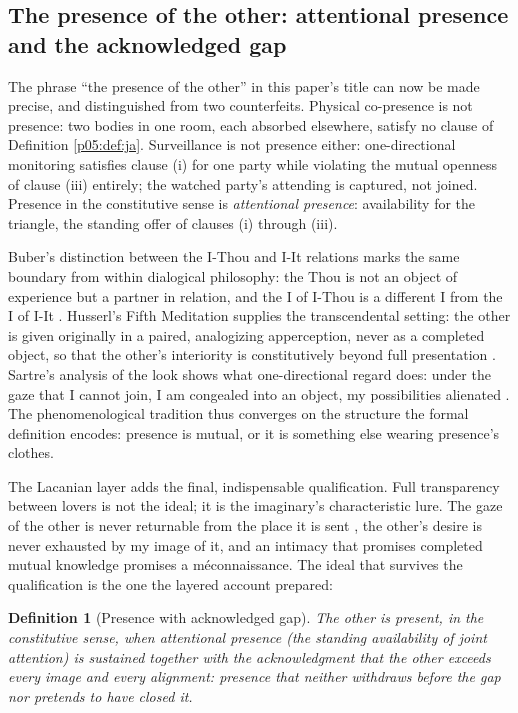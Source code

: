 \documentclass[11pt,a4paper]{article}
\theoremstyle{seriesthm}
\newtheorem{defn}{Definition}
\begin{document}
\subsection{The presence of the other: attentional presence and the acknowledged gap}
\label{p05:sec:presence}

The phrase ``the presence of the other'' in this paper's title can now be made precise, and distinguished from two counterfeits. Physical co-presence is not presence: two bodies in one room, each absorbed elsewhere, satisfy no clause of Definition \ref{p05:def:ja}. Surveillance is not presence either: one-directional monitoring satisfies clause (i) for one party while violating the mutual openness of clause (iii) entirely; the watched party's attending is captured, not joined. Presence in the constitutive sense is \emph{attentional presence}: availability for the triangle, the standing offer of clauses (i) through (iii).

Buber's distinction between the I-Thou and I-It relations marks the same boundary from within dialogical philosophy: the Thou is not an object of experience but a partner in relation, and the I of I-Thou is a different I from the I of I-It \parencite{buber1970}. Husserl's Fifth Meditation supplies the transcendental setting: the other is given originally in a paired, analogizing apperception, never as a completed object, so that the other's interiority is constitutively beyond full presentation \parencite{husserl1960}. Sartre's analysis of the look shows what one-directional regard does: under the gaze that I cannot join, I am congealed into an object, my possibilities alienated \parencite{sartre1956}. The phenomenological tradition thus converges on the structure the formal definition encodes: presence is mutual, or it is something else wearing presence's clothes.

The Lacanian layer adds the final, indispensable qualification. Full transparency between lovers is not the ideal; it is the imaginary's characteristic lure. The gaze of the other is never returnable from the place it is sent \parencite{lacan1977xi}, the other's desire is never exhausted by my image of it, and an intimacy that promises completed mutual knowledge promises a m\'econnaissance. The ideal that survives the qualification is the one the layered account prepared:

\begin{defn}[Presence with acknowledged gap]\label{p05:def:presence}
The other is present, in the constitutive sense, when attentional presence (the standing availability of joint attention) is sustained together with the acknowledgment that the other exceeds every image and every alignment: presence that neither withdraws before the gap nor pretends to have closed it.
\end{defn}
\end{document}
